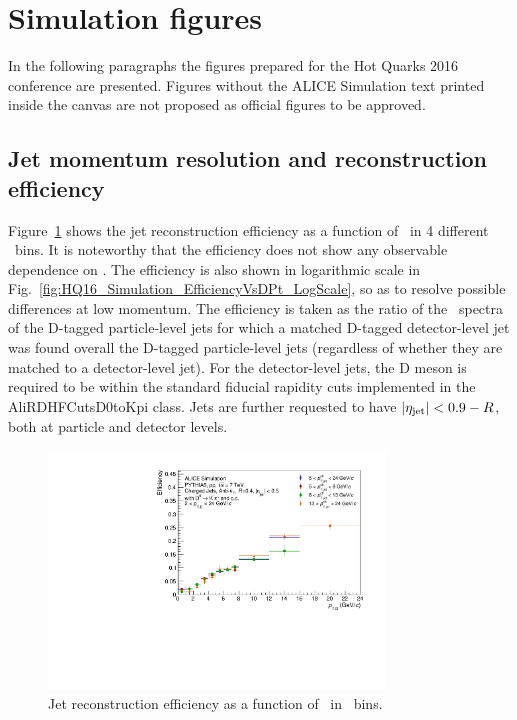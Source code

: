 \section{Simulation figures}
In the following paragraphs the figures prepared for the Hot Quarks 2016 conference are presented. Figures without the ALICE Simulation
text printed inside the canvas are not proposed as official figures to be approved.
\subsection{Jet momentum resolution and reconstruction efficiency}
Figure~\ref{fig:HQ16_Simulation_EfficiencyVsDPt} shows the jet reconstruction efficiency as a function of \ptd\ in 4 different \ptchjet\ bins.
It is noteworthy that the efficiency does not show any observable dependence on \ptchjet.
The efficiency is also shown in logarithmic scale in Fig.~\ref{fig:HQ16_Simulation_EfficiencyVsDPt_LogScale}, so as to resolve possible
differences at low momentum.
The efficiency is taken as the ratio of the \ptd\ spectra of the D-tagged particle-level jets for which a matched
D-tagged detector-level jet was found overall the D-tagged particle-level jets (regardless of whether they are matched to a detector-level jet).
For the detector-level jets, the D meson is required to be within the standard fiducial rapidity cuts implemented in the AliRDHFCutsD0toKpi class.
Jets are further requested to have $|\eta_{\rm jet}| < 0.9 - R$, both at particle and detector levels.
\begin{figure}[tbh]
\begin{center}
\includegraphics[width=0.8\textwidth]{img/HQ16_Simulation_EfficiencyVsDPt}
 \caption{Jet reconstruction efficiency as a function of \ptd\ in \ptchjet\ bins.} 
 \label{fig:HQ16_Simulation_EfficiencyVsDPt}
\end{center}
\end{figure}

